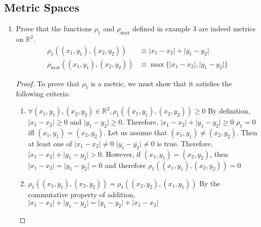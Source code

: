 \documentclass{article}
\begin{document}
\subsection{Metric Spaces}
\begin{enumerate}
      \item Prove that the functions $\rho_1$ and $\rho_{\max}$ defined in
            example 3 are indeed metrics on $\mathbb{R}^2$.
            \begin{align*}
                  \rho_1((x_1, y_1), (x_2, y_2))      & \equiv \lvert x_1-x_2\rvert + \lvert y_1-y_2\rvert        \\
                  \rho_{\max}((x_1, y_1), (x_2, y_2)) & \equiv \max\{\lvert x_1-x_2\rvert, \lvert y_1-y_2\rvert\}
            \end{align*}
            \begin{proof}
                  To prove that $\rho_1$ is a metric, we must show that it satisfies
                  the following criteria:
                  \begin{enumerate}
                        \item $\forall (x_1,y_1),(x_2,y_2)\in\mathbb{R}^2, \rho_1((x_1,y_1),(x_2,y_2))\geq 0$
                              \medbreak
                              By definition, $\lvert x_1-x_2\rvert\geq 0$ and $\lvert y_1-y_2\rvert\geq 0$.
                              Therefore, $\lvert x_1-x_2\rvert+\lvert y_1-y_2\rvert\geq 0$
                              \medbreak
                              $\rho_1=0$ iff $(x_1,y_1)=(x_2,y_2)$.
                              \medbreak
                              Let us assume that $(x_1,y_1)\neq (x_2,y_2)$. Then at least one of $\lvert x_1-x_2\rvert\neq 0$
                              $\lvert y_1-y_2\rvert\neq 0$ is true. Therefore, $\lvert x_1-x_2\rvert+\lvert y_1-y_2\rvert> 0$.
                              However, if $(x_1,y_1) = (x_2,y_2)$, then $\lvert x_1-x_2\rvert = \lvert y_1-y_2\rvert = 0$ and
                              therefore $\rho_1((x_1,y_1),(x_2,y_2))=0$

                        \item $\rho_1((x_1,y_1),(x_2,y_2)) = \rho_1((x_2,y_2),(x_1,y_1))$
                              \medbreak
                              By the commutative property of addition,
                              $\lvert x_1-x_2\rvert+\lvert y_1-y_2\rvert=\lvert y_1-y_2\rvert+\lvert x_1-x_2\rvert$


\end{enumerate}
\end{proof}
\end{enumerate}
\end{document}
